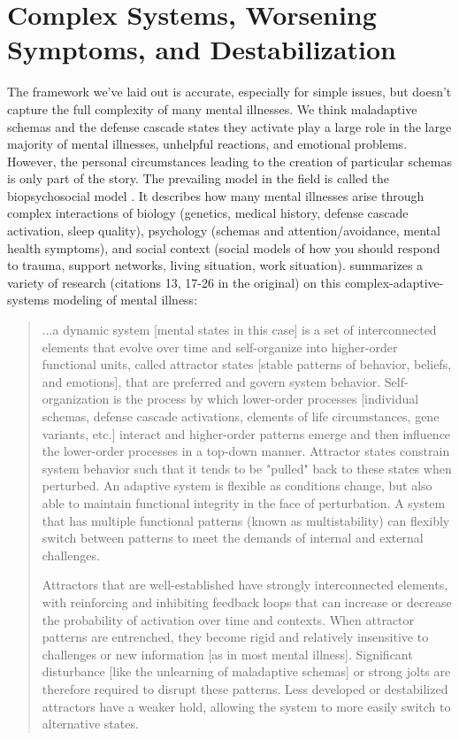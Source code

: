 \documentclass[12pt,letterpaper]{book}
\begin{document}
\section{Complex Systems, Worsening Symptoms, and Destabilization}
\label{sec:complex}
The framework we've laid out is accurate, especially for simple issues, but doesn't capture the full complexity of many mental illnesses. We think maladaptive schemas and the defense cascade states they activate play a large role in the large majority of mental illnesses, unhelpful reactions, and emotional problems. However, the personal circumstances leading to the creation of particular schemas is only part of the story. The prevailing model in the field is called the biopsychosocial model \cite{engel1977need}. It describes how many mental illnesses arise through complex interactions of biology (genetics, medical history, defense cascade activation, sleep quality), psychology (schemas and attention/avoidance, mental health symptoms), and social context (social models of how you should respond to trauma, support networks, living situation, work situation). \textcite{hayes2020complex} summarizes a variety of research (citations 13, 17-26 in the original) on this complex-adaptive-systems modeling of mental illness:
\begin{quotation}
	...a dynamic system [mental states in this case] is a set of interconnected elements that evolve over time and self-organize into higher-order functional units, called attractor states [stable patterns of behavior, beliefs, and emotions], that are preferred and govern system behavior. Self-organization is the process by which lower-order processes [individual schemas, defense cascade activations, elements of life circumstances, gene variants, etc.] interact and higher-order patterns emerge and then influence the lower-order processes in a top-down manner. Attractor states constrain system behavior such that it tends to be "pulled" back to these states when perturbed. An adaptive system is flexible as conditions change, but also able to maintain functional integrity in the face of perturbation. A system that has multiple functional patterns (known as multistability) can flexibly switch between patterns to meet the demands of internal and external challenges.
	
	Attractors that are well-established have strongly interconnected elements, with reinforcing and inhibiting feedback loops that can increase or decrease the probability of activation over time and contexts. When attractor patterns are entrenched, they become rigid and relatively insensitive to challenges or new information [as in most mental illness]. Significant disturbance [like the unlearning of maladaptive schemas] or strong jolts are therefore required to disrupt these patterns. Less developed or destabilized attractors have a weaker hold, allowing the system to more easily switch to alternative states.
\end{quotation}
\end{document}
